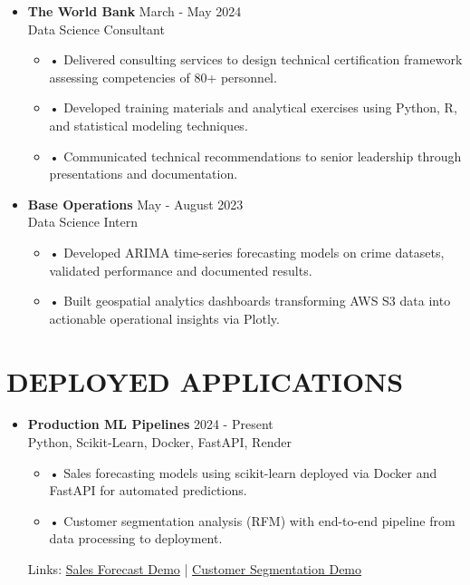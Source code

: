 \documentclass[a4paper,9pt]{extarticle}
\begin{document}
\noindent
\begin{itemize}[leftmargin=0.4cm, label={}]
    \item \textbf{The World Bank} \hfill March - May 2024 \\
    Data Science Consultant
    \vspace{-0.1cm}
    \begin{itemize}[leftmargin=0.3cm, label={}]
    \item \small{•} \normalsize{Delivered consulting services to design technical certification framework assessing competencies of 80+ personnel.}
    \item \small{•} \normalsize{Developed training materials and analytical exercises using Python, R, and statistical modeling techniques.}
    \item \small{•} \normalsize{Communicated technical recommendations to senior leadership through presentations and documentation.}
    \end{itemize}
\end{itemize}

\noindent
\begin{itemize}[leftmargin=0.4cm, label={}]
    \item \textbf{Base Operations} \hfill May - August 2023 \\
    Data Science Intern
    \vspace{-0.1cm}
    \begin{itemize}[leftmargin=0.3cm, label={}]
\item \small{•} \normalsize{Developed ARIMA time-series forecasting models on crime datasets, validated performance and documented results.}
    \item \small{•} \normalsize{Built geospatial analytics dashboards transforming AWS S3 data into actionable operational insights via Plotly.}
    \end{itemize}
\end{itemize}

\section*{DEPLOYED APPLICATIONS}

\begin{itemize}[leftmargin=0.4cm, label={}]
    \item \textbf{Production ML Pipelines} \hfill 2024 - Present \\
    Python, Scikit-Learn, Docker, FastAPI, Render
    \begin{itemize}[leftmargin=0.3cm, label={}]
    \item \small{•} \normalsize{Sales forecasting models using scikit-learn deployed via Docker and FastAPI for automated predictions.} 
    \item \small{•} \normalsize{Customer segmentation analysis (RFM) with end-to-end pipeline from data processing to deployment.}
    \end{itemize}
    Links: \href{https://twallett.com/sales-forecast}{Sales Forecast Demo} | \href{https://twallett.com/customer-segmentation}{Customer Segmentation Demo} 
\end{itemize}
\end{document}
